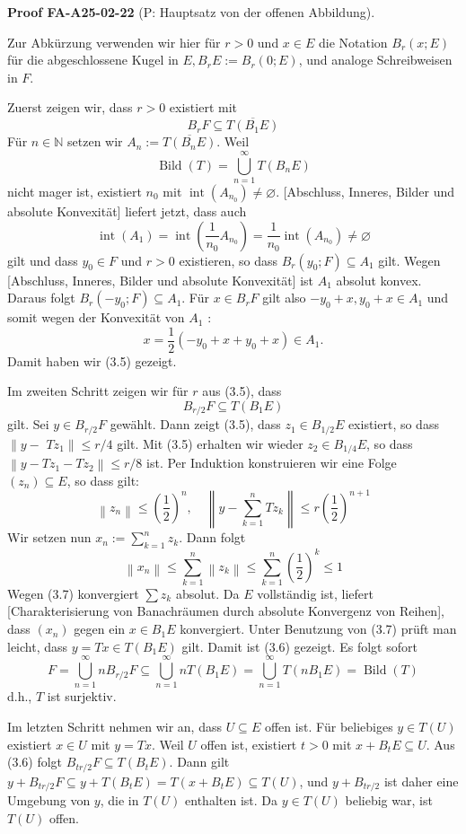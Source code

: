 \documentclass[10pt, letterpaper]{article}
\newcommand{\CustomHeading}[3]{%
  \par\medskip\noindent%
  \textbf{#1 #2} \textnormal{(#3)}.\enskip%
}
\newenvironment{PROOF}[2]{\begin{unitbox}\CustomHeading{Proof}{#1}{#2}}{\end{unitbox}}
\begin{document}
\begin{PROOF}{FA-A25-02-22}{P: Hauptsatz von der offenen Abbildung}
Zur Abkürzung verwenden wir hier für $r>0$ und $x \in E$ die Notation $B_{r}(x ; E)$ für die abgeschlossene Kugel in $E, B_{r} E:=B_{r}(0 ; E)$, und analoge Schreibweisen in $F$.

Zuerst zeigen wir, dass $r>0$ existiert mit
$$
B_{r} F \subseteq \overline{T\left(B_{1} E\right)}
$$
Für $n \in \mathbb{N}$ setzen wir $A_{n}:=\overline{T\left(B_{n} E\right)}$. Weil
$$
\operatorname{Bild}(T)=\bigcup_{n=1}^{\infty} T\left(B_{n} E\right)
$$
nicht mager ist, existiert $n_{0}$ mit $\operatorname{int}\left(A_{n_{0}}\right) \neq \varnothing$. [Abschluss, Inneres, Bilder und absolute Konvexität] liefert jetzt, dass auch
$$
\operatorname{int}\left(A_{1}\right)=\operatorname{int}\left(\frac{1}{n_{0}} A_{n_{0}}\right)=\frac{1}{n_{0}} \operatorname{int}\left(A_{n_{0}}\right) \neq \varnothing
$$
gilt und dass $y_{0} \in F$ und $r>0$ existieren, so dass $B_{r}\left(y_{0} ; F\right) \subseteq A_{1}$ gilt. Wegen [Abschluss, Inneres, Bilder und absolute Konvexität] ist $A_{1}$ absolut konvex. Daraus folgt $B_{r}\left(-y_{0} ; F\right) \subseteq A_{1}$. Für $x \in B_{r} F$ gilt also $-y_{0}+x, y_{0}+x \in A_{1}$ und somit wegen der Konvexität von $A_{1}$ :
$$
x=\frac{1}{2}\left(-y_{0}+x+y_{0}+x\right) \in A_{1} .
$$
Damit haben wir (3.5) gezeigt.

Im zweiten Schritt zeigen wir für $r$ aus (3.5), dass
$$
B_{r / 2} F \subseteq T\left(B_{1} E\right)
$$
gilt. Sei $y \in B_{r / 2} F$ gewählt. Dann zeigt (3.5), dass $z_{1} \in B_{1 / 2} E$ existiert, so dass $\| y-$ $T z_{1} \| \leq r / 4$ gilt. Mit (3.5) erhalten wir wieder $z_{2} \in B_{1 / 4} E$, so dass $\left\|y-T z_{1}-T z_{2}\right\| \leq r / 8$ ist. Per Induktion konstruieren wir eine Folge $\left(z_{n}\right) \subseteq E$, so dass gilt:
$$
\left\|z_{n}\right\| \leq\left(\frac{1}{2}\right)^{n}, \quad\left\|y-\sum_{k=1}^{n} T z_{k}\right\| \leq r\left(\frac{1}{2}\right)^{n+1}
$$
Wir setzen nun $x_{n}:=\sum_{k=1}^{n} z_{k}$. Dann folgt
$$
\left\|x_{n}\right\| \leq \sum_{k=1}^{n}\left\|z_{k}\right\| \leq \sum_{k=1}^{n}\left(\frac{1}{2}\right)^{k} \leq 1
$$
Wegen (3.7) konvergiert $\sum z_{k}$ absolut. Da $E$ vollständig ist, liefert [Charakterisierung von Banachräumen durch absolute Konvergenz von Reihen], dass $\left(x_{n}\right)$ gegen ein $x \in B_{1} E$ konvergiert. Unter Benutzung von (3.7) prüft man leicht, dass $y=T x \in T\left(B_{1} E\right)$ gilt. Damit ist (3.6) gezeigt. Es folgt sofort
$$
F=\bigcup_{n=1}^{\infty} n B_{r / 2} F \subseteq \bigcup_{n=1}^{\infty} n T\left(B_{1} E\right)=\bigcup_{n=1}^{\infty} T\left(n B_{1} E\right)=\operatorname{Bild}(T)
$$
d.h., $T$ ist surjektiv.

Im letzten Schritt nehmen wir an, dass $U \subseteq E$ offen ist. Für beliebiges $y \in T(U)$ existiert $x \in U$ mit $y=T x$. Weil $U$ offen ist, existiert $t>0$ mit $x+B_{t} E \subseteq U$. Aus (3.6) folgt $B_{t r / 2} F \subseteq T\left(B_{t} E\right)$. Dann gilt $y+B_{t r / 2} F \subseteq y+T\left(B_{t} E\right)=T\left(x+B_{t} E\right) \subseteq T(U)$, und $y+B_{t r / 2}$ ist daher eine Umgebung von $y$, die in $T(U)$ enthalten ist. Da $y \in T(U)$ beliebig war, ist $T(U)$ offen.
\end{PROOF}
\end{document}
